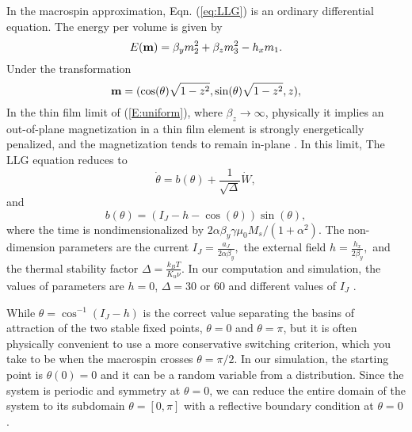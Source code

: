 \documentclass[journal,transmag]{IEEEtran}
\begin{document}
In the macrospin approximation, Eqn. (\ref{eq:LLG}) is an ordinary differential equation. The energy per volume is given by
%
\begin{equation} \label{E:uniform}
E({\bf{m}}) =  \beta_y m_2^2+\beta_z m_3^2- h_x m_1.
\end{equation}
%
Under the transformation
%
\begin{equation}
{\bf{m}} = (\cos(\theta) \sqrt{1-z^2}, \sin(\theta) \sqrt{1-z^2},z),
\end{equation}
%
In the thin film limit of (\ref{E:uniform}), where $\beta_z \rightarrow \infty$, physically it implies  an out-of-plane magnetization in a thin film element is strongly energetically penalized, and the magnetization tends to remain in-plane \cite{Kohn2005}. In this limit, The LLG equation reduces to
\begin{equation}  \label{sys:macro}
 \dot{\theta} = b(\theta)+ \frac{1}{ \sqrt{\Delta}} \dot{W},
\end{equation}
and
\begin{equation}
b(\theta) = (I_J-h -\cos(\theta))\sin(\theta),
\end{equation}
 where the time is nondimensionalized by $2\alpha \beta_y \gamma \mu_0 M_s/(1+\alpha^2).$   %
The non-dimension parameters are the current $ I_J= \frac{a_J}{2 \alpha \beta_y},$ the external field $h = \frac{h_x}{2 \beta_y},$ and the thermal stability factor $ \Delta = \frac{k_B T}{K_u \nu}.$ In our computation and simulation,  the values of parameters are $h = 0$,  $ \Delta=30$ or $60$ and different values of $I_J$ \cite{6242414}.

While $ \theta =\cos^{-1}(I_J-h)$  is the correct value separating the basins of attraction of the two stable fixed points, $\theta = 0$ and $\theta = \pi$, but it is often physically convenient to use a more conservative switching criterion, which you take to be when the macrospin crosses $\theta = \pi/2.$ In our simulation, the starting point is $\theta(0) = 0$ and it can be a random variable from a distribution. Since the system is periodic and symmetry at $\theta=0$, we can reduce the entire domain of the system to its subdomain $\theta = [0,\pi]$ with a reflective boundary condition at $\theta = 0$.

\end{document}
